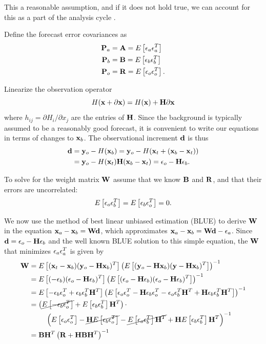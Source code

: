 \documentclass[12pt]{report}
\begin{document}
This a reasonable assumption, and if it does not hold true, we can account for this as a part of the analysis cycle .

Define the forecast error covariances as
\begin{align} \mathbf{P}_a &= \mathbf{A} = E \left [ \mathbf{\epsilon}_a \mathbf{\epsilon}_a ^T \right ]\\
\mathbf{P}_b &= \mathbf{B} = E \left [  \mathbf{\epsilon}_b \mathbf{\epsilon}_b ^T \right ]\\ 
\mathbf{P}_o &= \mathbf{R} = E \left [  \mathbf{\epsilon}_o \mathbf{\epsilon}_o ^T \right ] . \end{align}

Linearize the observation operator
\begin{equation} H(\mathbf{x} + \partial \mathbf{x} ) = H(\mathbf{x}) + \mathbf{H} \partial \mathbf{x} \end{equation}
where $h_{ij} = \partial H_i / \partial x_j$ are the entries of $\mathbf{H}$.
Since the background is typically assumed to be a reasonably good forecast, it is convenient to write our equations in terms of changes to $\mathbf{x} _b$.
The observational increment $\mathbf{d}$ is thus
\begin{align} \mathbf{d} &= \mathbf{y}_o - H(\mathbf{x}_b) = \mathbf{y}_o - H(\mathbf{x}_t + (\mathbf{x}_b-\mathbf{x}_t)) \\
&= \mathbf{y}_o - H(\mathbf{x} _t) \mathbf{H} (\mathbf{x}_b -\mathbf{x}_t) = \mathbf{\epsilon}_o - \mathbf{H} \mathbf{\epsilon}_b . \end{align} 

To solve for the weight matrix $\mathbf{W}$ assume that we know $\mathbf{B}$ and $\mathbf{R}$, and that their errors are uncorrelated:
\begin{equation} E \left [  \mathbf{\epsilon}_o \mathbf{\epsilon}_b ^T  \right ] = E \left [ \mathbf{\epsilon}_b\mathbf{\epsilon}_o ^T \right ] = 0 . \end{equation}

We now use the method of best linear unbiased estimation (BLUE) to derive $\mathbf{W}$ in the equation $\mathbf{x}_a - \mathbf{x} _b = \mathbf{W} \mathbf{d}$, which approximates $\mathbf{x}_a - \mathbf{x}_b = \mathbf{W} \mathbf{d} - \mathbf{\epsilon}_a$.
Since $\mathbf{d} = \mathbf{\epsilon}_o - \mathbf{H} \mathbf{\epsilon}_b$ and the well known BLUE solution to this simple equation, the $\mathbf{W}$ that minimizes $\mathbf{\epsilon}_a \mathbf{\epsilon}_a ^T$ is given by
\begin{align*} \mathbf{W} &= E\left [ ( \mathbf{x} _t - \mathbf{x} _b ) ( \mathbf{y} _o - \mathbf{H} \mathbf{x} _b )^T \right] \left (E \left [ (\mathbf{y} _o - \mathbf{H} \mathbf{x} _b)(\mathbf{y} - \mathbf{H} \mathbf{x} _b)^T    \right ] \right ) ^{-1}\\
&= E\left [ (- \mathbf{\epsilon} _b ) (\mathbf{\epsilon} _o  - \mathbf{H} \mathbf{\epsilon} _b ) ^T \right ] \left ( E \left [ (\mathbf{\epsilon} _o - \mathbf{H} \mathbf{\epsilon} _b )( \mathbf{\epsilon} _o - \mathbf{H} \mathbf{\epsilon} _b ) ^T \right ] \right ) ^{-1} \\
&= E \left [ - \mathbf{\epsilon} _b \mathbf{\epsilon} _o ^T + \mathbf{\epsilon} _b \mathbf{\epsilon} _b ^T \mathbf{H} ^T \right ] \left ( E \left [ \mathbf{\epsilon} _o \mathbf{\epsilon}_o ^T - \mathbf{H} \mathbf{\epsilon} _b \mathbf{\epsilon}_o ^T - \mathbf{\epsilon} _o \mathbf{\epsilon} _b ^T \mathbf{H} ^T + \mathbf{H} \mathbf{\epsilon} _b \mathbf{\epsilon} _b ^T \mathbf{H} ^T \right ] \right ) ^{-1}\\
&= \left ( \cancel{E\left [ - \mathbf{\epsilon} _b \mathbf{\epsilon} _o ^T \right ]} + E \left [ \mathbf{\epsilon} _b \mathbf{\epsilon} _b ^T \right ] \mathbf{H} ^T \right ) \cdot \\
& ~~~~~~~\left ( E \left [ \mathbf{\epsilon} _o \mathbf{\epsilon} _o ^T \right ] - \cancel{\mathbf{H} E\left [ \mathbf{\epsilon} _b \mathbf{\epsilon} _o ^T \right ]} - \cancel{E \left [ \mathbf{\epsilon} _o \mathbf{\epsilon} _b ^T \right ] \mathbf{H} ^T } + \mathbf{H} E \left [ \mathbf{\epsilon} _b \mathbf{\epsilon} _b ^T \right ] \mathbf{H} ^T \right ) ^{-1}\\
&= \mathbf{B} \mathbf{H} ^T \left ( \mathbf{R} + \mathbf{H} \mathbf{B} \mathbf{H} ^T \right ) ^{-1}  \end{align*}
\end{document}

